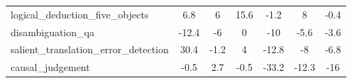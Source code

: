 \documentclass[11pt]{article}
\begin{document}
\begin{table}[htbp]
{\begin{tabular}{l|c|c|c|c|c|c}
logical\_deduction\_five\_objects          &               6.8 &          6   &                15.6 &                 -1.2 &          8   &             -0.4 \\
disambiguation\_qa                       &             -12.4 &         -6   &                 0   &                -10   &         -5.6 &             -3.6 \\
salient\_translation\_error\_detection     &              30.4 &         -1.2 &                 4   &                -12.8 &         -8   &             -6.8 \\
 causal\_judgement                        &              -0.5 &          2.7 &                -0.5 &                -33.2 &        -12.3 &            -16   \\
\bottomrule
\end{tabular}
}
\end{table}
\end{document}
